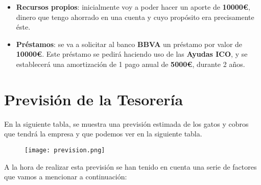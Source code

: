 \begin{itemize}
    \item \textbf{Recursos propios}: inicialmente voy a poder hacer un aporte de \textbf{10000€}, dinero que tengo ahorrado en una cuenta y cuyo propósito era precisamente éste.
    \item \textbf{Préstamos}: se va a solicitar al banco \textbf{BBVA} un préstamo por valor de \textbf{10000€}. Este préstamo se pedirá haciendo uso de las \textbf{Ayudas ICO}, y se establecerá una amortización de 1 pago anual de \textbf{5000€}, durante 2 años.
\end{itemize}

\section{Previsión de la Tesorería}
En la siguiente tabla, se muestra una previsión estimada de los gatos y cobros que tendrá la empresa y que podemos ver en la siguiente tabla.

\begin{figure}[H]
    \centering
    \texttt{[image: prevision.png]}
\end{figure}

A la hora de realizar esta previsión se han tenido en cuenta una serie de factores que vamos a mencionar a continuación:

